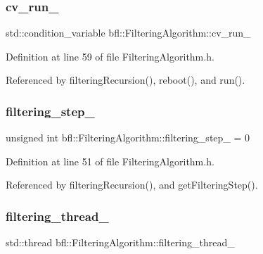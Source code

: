 \subsubsection{\texorpdfstring{cv\+\_\+run\+\_\+}{cv\_run\_}}
{\footnotesize\ttfamily std\+::condition\+\_\+variable bfl\+::\+Filtering\+Algorithm\+::cv\+\_\+run\+\_\+\hspace{0.3cm}{\ttfamily [private]}}



Definition at line 59 of file Filtering\+Algorithm.\+h.



Referenced by filtering\+Recursion(), reboot(), and run().

\mbox{\label{classbfl_1_1FilteringAlgorithm_a1d08a5db263e415138d88c9a01535767}} 
\subsubsection{\texorpdfstring{filtering\+\_\+step\+\_\+}{filtering\_step\_}}
{\footnotesize\ttfamily unsigned int bfl\+::\+Filtering\+Algorithm\+::filtering\+\_\+step\+\_\+ = 0\hspace{0.3cm}{\ttfamily [private]}}



Definition at line 51 of file Filtering\+Algorithm.\+h.



Referenced by filtering\+Recursion(), and get\+Filtering\+Step().

\mbox{\label{classbfl_1_1FilteringAlgorithm_a2fa16711fd751628977afbbf9f7e9d6d}} 
\subsubsection{\texorpdfstring{filtering\+\_\+thread\+\_\+}{filtering\_thread\_}}
{\footnotesize\ttfamily std\+::thread bfl\+::\+Filtering\+Algorithm\+::filtering\+\_\+thread\+\_\+\hspace{0.3cm}{\ttfamily [private]}}



